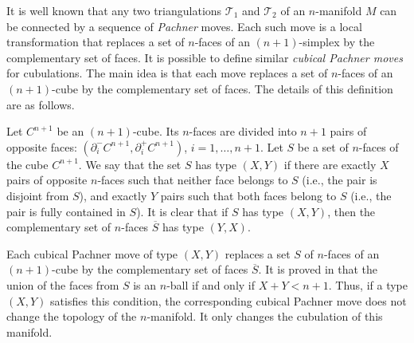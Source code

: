 \documentclass{amsart}
\begin{document}
It is well known that any two triangulations $\mathcal{T}_1$ and $\mathcal{T}_2$ of an $n$-manifold $M$ can be connected by a sequence of \emph{Pachner} moves. Each such move is a local transformation that replaces a set of $n$-faces of an $(n + 1)$-simplex by the complementary set of faces. It is possible to define similar \emph{cubical Pachner moves} for cubulations. The main idea is that each move replaces a set of $n$-faces of an $(n + 1)$-cube by the complementary set of faces. The details of this definition are as follows.

Let $C^{n + 1}$ be an $(n + 1)$-cube. Its $n$-faces are divided into $n + 1$ pairs of opposite faces: $(\partial_i^{-}C^{n + 1}, \partial_i^{+}C^{n + 1})$, $i = 1, \ldots, n + 1$. Let $S$ be a set of $n$-faces of the cube $C^{n + 1}$. We say that the set $S$ has type $(X, Y)$ if there are exactly $X$ pairs of opposite $n$-faces such that neither face belongs to $S$ (i.e., the pair is disjoint from $S$), and exactly $Y$ pairs such that both faces belong to $S$ (i.e., the pair is fully contained in $S$). It is clear that if $S$ has type $(X, Y)$, then the complementary set of $n$-faces $\overline{S}$ has type $(Y, X)$.

Each cubical Pachner move of type $(X, Y)$ replaces a set $S$ of $n$-faces of an $(n + 1)$-cube by the complementary set of faces $\overline{S}$. It is proved in \cite[Lemma 1]{BEE} that the union of the faces from $S$ is an $n$-ball if and only if $X + Y < n + 1$. Thus, if a type $(X, Y)$ satisfies this condition, the corresponding cubical Pachner move does not change the topology of the $n$-manifold. It only changes the cubulation of this manifold.
\end{document}
